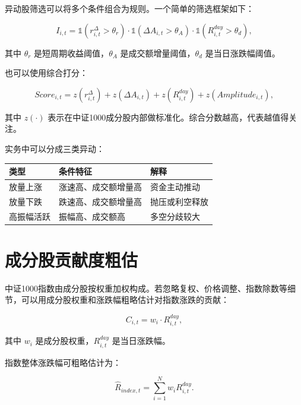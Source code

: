 \documentclass[UTF8,a4paper,12pt]{ctexart}
\begin{document}
异动股筛选可以将多个条件组合为规则。一个简单的筛选框架如下：

\begin{equation}
I_{i,t} =
\mathbb{1}(r_{i,t}^{\Delta} > \theta_r)
\cdot
\mathbb{1}(\Delta A_{i,t} > \theta_A)
\cdot
\mathbb{1}(R_{i,t}^{day} > \theta_d),
\end{equation}

其中 $\theta_r$ 是短周期收益阈值，$\theta_A$ 是成交额增量阈值，$\theta_d$ 是当日涨跌幅阈值。

也可以使用综合打分：

\begin{equation}
Score_{i,t}
= z(r_{i,t}^{\Delta})
+ z(\Delta A_{i,t})
+ z(R_{i,t}^{day})
+ z(Amplitude_{i,t}),
\end{equation}

其中 $z(\cdot)$ 表示在中证1000成分股内部做标准化。综合分数越高，代表越值得关注。

实务中可以分成三类异动：

\begin{table}[h]
\centering
\begin{tabular}{lll}
\toprule
类型 & 条件特征 & 解释 \\
\midrule
放量上涨 & 涨速高、成交额增量高 & 资金主动推动 \\
放量下跌 & 跌速高、成交额增量高 & 抛压或利空释放 \\
高振幅活跃 & 振幅高、成交额高 & 多空分歧较大 \\
\bottomrule
\end{tabular}
\end{table}

\section{成分股贡献度粗估}

中证1000指数由成分股按权重加权构成。若忽略复权、价格调整、指数除数等细节，可以用成分股权重和涨跌幅粗略估计对指数涨跌的贡献：

\begin{equation}
C_{i,t} = w_i \cdot R_{i,t}^{day},
\end{equation}

其中 $w_i$ 是成分股权重，$R_{i,t}^{day}$ 是当日涨跌幅。

指数整体涨跌幅可粗略估计为：

\begin{equation}
\hat{R}_{index,t} = \sum_{i=1}^{N} w_i R_{i,t}^{day}.
\end{equation}
\end{document}
